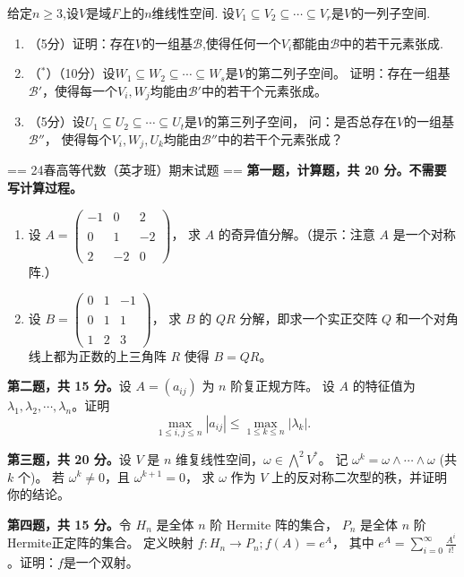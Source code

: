     给定$n\geq 3$,设$V$是域$F$上的$n$维线性空间.
    设$V_1\subseteq V_2\subseteq\cdots\subseteq V_r$是$V$的一列子空间.
    \begin{enumerate}
    \item（5分）证明：存在$V$的一组基$\mathcal{B}$,使得任何一个$V_i$都能由$\mathcal{B}$中的若干元素张成.
    \item（$^*$）（10分）设$W_1\subseteq W_2\subseteq\cdots\subseteq W_s$是$V$的第二列子空间。
    证明：存在一组基$\mathcal{B}'$，使得每一个$V_i,W_j$均能由$\mathcal{B}'$中的若干个元素张成。
    \item（5分）设$U_1\subseteq U_2\subseteq\cdots\subseteq U_t$是$V$的第三列子空间，
    问：是否总存在$V$的一组基$\mathcal{B}''$，
    使得每个$V_i,W_j,U_k$均能由$\mathcal{B}''$中的若干个元素张成？
    \end{enumerate}

== 24春高等代数（英才班）期末试题 ==
\textbf{第一题，计算题，共 20 分。不需要写计算过程。}
\begin{enumerate}
\item 设 $A=\begin{pmatrix}-1 & 0 & 2 \\ \\ 0 & 1 & -2 \\ \\ 2 & -2 & 0\end{pmatrix}$，
求 $A$ 的奇异值分解。（提示：注意 $A$ 是一个对称阵.）
\item 设 $B=\begin{pmatrix}0 & 1 & -1 \\ \\ 0 & 1 & 1 \\ \\ 1 & 2 & 3\end{pmatrix}$，
求 $B$ 的 $QR$ 分解，即求一个实正交阵 $Q$ 和一个对角线上都为正数的上三角阵 $R$ 使得 $B=QR$。
\end{enumerate}

\textbf{第二题，共 15 分。}设 $A=(a_{ij})$ 为 $n$ 阶复正规方阵。
设 $A$ 的特征值为 $\lambda_{1}, \lambda_{2}, \cdots, \lambda_{n}$。证明
$$\max_{1 \leq i, j \leq n}|a_{ij}| \leq \max_{1 \leq k \leq n}|\lambda_{k}|.$$

\textbf{第三题，共 20 分。}设 $V$ 是 $n$ 维复线性空间，$\omega \in \bigwedge^{2} V^{*}$。
记 $\omega^{k}=\omega \wedge \cdots \wedge \omega$ (共 $k$ 个)。
若 $\omega^{k} \neq 0$，且 $\omega^{k+1}=0$，
求 $\omega$ 作为 $V$ 上的反对称二次型的秩，并证明你的结论。

\textbf{第四题，共 15 分。}令 $H_{n}$ 是全体 $n$ 阶 Hermite 阵的集合，
$P_{n}$ 是全体 $n$ 阶 Hermite正定阵的集合。
定义映射 $f: H_{n} \rightarrow P_{n} ; f(A)=e^{A}$，
其中 $e^{A}=\sum_{i=0}^{\infty} \frac{A^{i}}{i!}$。证明：$f$是一个双射。

